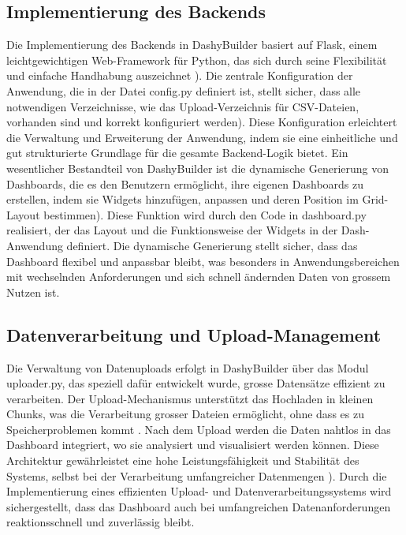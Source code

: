 \documentclass[a4paper, 12pt]{scrartcl}
\begin{document}
\subsection{Implementierung des Backends}
Die Implementierung des Backends in DashyBuilder basiert auf Flask, einem leichtgewichtigen Web-Framework für Python, das sich durch seine Flexibilität und einfache Handhabung auszeichnet \cite[S.119]{Relan2019}). Die zentrale Konfiguration der Anwendung, die in der Datei config.py definiert ist, stellt sicher, dass alle notwendigen Verzeichnisse, wie das Upload-Verzeichnis für CSV-Dateien, vorhanden sind und korrekt konfiguriert werden\cite{Chauhan2019}). Diese Konfiguration erleichtert die Verwaltung und Erweiterung der Anwendung, indem sie eine einheitliche und gut strukturierte Grundlage für die gesamte Backend-Logik bietet. Ein wesentlicher Bestandteil von DashyBuilder ist die dynamische Generierung von Dashboards, die es den Benutzern ermöglicht, ihre eigenen Dashboards zu erstellen, indem sie Widgets hinzufügen, anpassen und deren Position im Grid-Layout bestimmen\cite{Vogel2017}). Diese Funktion wird durch den Code in dashboard.py realisiert, der das Layout und die Funktionsweise der Widgets in der Dash-Anwendung definiert. Die dynamische Generierung stellt sicher, dass das Dashboard flexibel und anpassbar bleibt, was besonders in Anwendungsbereichen mit wechselnden Anforderungen und sich schnell ändernden Daten von grossem Nutzen ist.

\subsection{Datenverarbeitung und Upload-Management}
Die Verwaltung von Datenuploads erfolgt in DashyBuilder über das Modul uploader.py, das speziell dafür entwickelt wurde, grosse Datensätze effizient zu verarbeiten. Der Upload-Mechanismus unterstützt das Hochladen in kleinen Chunks, was die Verarbeitung grosser Dateien ermöglicht, ohne dass es zu Speicherproblemen kommt \cite{Mallafi2016}. Nach dem Upload werden die Daten nahtlos in das Dashboard integriert, wo sie analysiert und visualisiert werden können. Diese Architektur gewährleistet eine hohe Leistungsfähigkeit und Stabilität des Systems, selbst bei der Verarbeitung umfangreicher Datenmengen \cite{PGohil2015}). Durch die Implementierung eines effizienten Upload- und Datenverarbeitungssystems wird sichergestellt, dass das Dashboard auch bei umfangreichen Datenanforderungen reaktionsschnell und zuverlässig bleibt.
\end{document}
